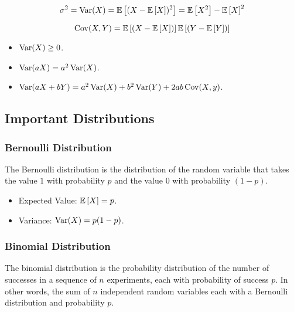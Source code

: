 \documentclass[12pt, titlepage]{article}
\begin{document}
\begin{dfn}[Variance]{}
\[\sigma^2 = \operatorname{Var}(X) = \mathbb{E}\left[(X - \mathbb{E}\left[X\right])^2\right] = \mathbb{E}\left[X^2\right] - \mathbb{E}\left[X\right]^2\]
\end{dfn}

\begin{dfn}[Covariance]{}
\[\operatorname{Cov}(X, Y) = \mathbb{E}\left[(X - \mathbb{E}\left[X\right])\right]\mathbb{E}\left[(Y - \mathbb{E}\left[Y\right])\right]\]
\end{dfn}

\begin{rmk}{}
\begin{itemize}
	\item $\operatorname{Var}(X) \geq 0$.
	\item $\operatorname{Var}(aX) = a^2\operatorname{Var}(X)$.
	\item $\operatorname{Var}(aX + bY) = a^2\operatorname{Var}(X) + b^2\operatorname{Var}(Y) + 2ab\operatorname{Cov}(X, y)$.
	
\end{itemize}
\end{rmk}

\subsection{Important Distributions}

\subsubsection{Bernoulli Distribution}

\begin{rmk}{}
The Bernoulli distribution is the distribution of the random variable that takes the value $1$ with probability $p$ and the value $0$ with probability $(1-p)$.
\end{rmk}

\begin{info}{}
\begin{itemize}
	\item Expected Value: $\mathbb{E}\left[X\right] = p$.
	\item Variance: $\operatorname{Var}(X) = p(1-p)$.
\end{itemize}
\end{info}

\subsubsection{Binomial Distribution}

\begin{rmk}{}
The binomial distribution is the probability distribution of the number of successes in a sequence of $n$ experiments, each with probability of success $p$. In other words, the sum of $n$ independent random variables each with a Bernoulli distribution and probability $p$. 
\end{rmk}
\end{document}
